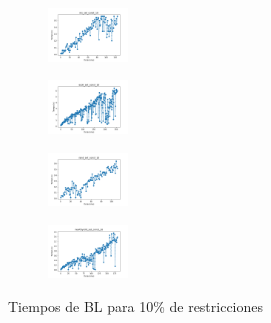 \begin{figure}[H]
\begin{subfigure}
    \end{subfigure}
    \hfill
    \begin{subfigure}
        \centering
        \includegraphics[width=0.234\textwidth]{img/bl/iris_set_const_10_3773969821_time.png}
    \end{subfigure}
    \hfill
    \begin{subfigure}
        \centering
        \includegraphics[width=0.234\textwidth]{img/bl/ecoli_set_const_10_3773969821_time.png}
    \end{subfigure}
    \hfill
    \begin{subfigure}
        \centering
        \includegraphics[width=0.234\textwidth]{img/bl/rand_set_const_10_3773969821_time.png}
    \end{subfigure}
    \hfill
    \begin{subfigure}
        \centering
        \includegraphics[width=0.234\textwidth]{img/bl/newthyroid_set_const_10_3773969821_time.png}
    \end{subfigure}
    \caption{Tiempos de BL para 10\% de restricciones}
\end{figure}

\vspace*{\fill}
\newpage
\vspace*{\fill}

